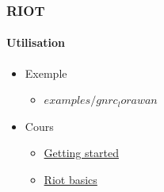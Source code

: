 \begin{frame}
\frametitle{RIOT}
\framesubtitle{Utilisation}
\begin{itemize}
  \item Exemple
  \begin{itemize}
    \item \href{https://github.com/RIOT-OS/RIOT/tree/master/examples/gnrc_lorawan}{$examples/gnrc_lorawan$}
  \end{itemize}
  \item Cours
  \begin{itemize}
    \item \href{https://riot-os.github.io/riot-course/slides/02-getting-started/}{Getting started}
    \item \href{https://riot-os.github.io/riot-course/slides/03-riot-basics}{Riot basics}
  \end{itemize}
\end{itemize}
\end{frame}

